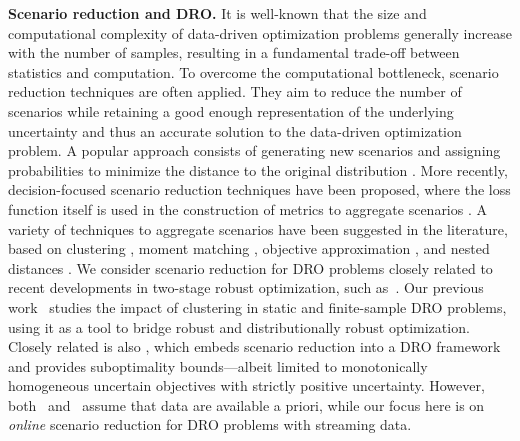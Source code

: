 \documentclass[12pt]{article}
\renewcommand{\paragraph}[1]{\textbf{#1.}\;}
\begin{document}
\paragraph{Scenario reduction and \gls{DRO}}
It is well-known that the size and computational complexity of data-driven optimization problems generally increase with the number of samples\ifpreprint, resulting in a fundamental trade-off between statistics and computation\fi. To overcome the computational bottleneck, scenario reduction techniques are often applied. They aim to reduce the number of scenarios while retaining a good enough representation of the underlying uncertainty and thus an accurate solution to the data-driven optimization problem. A popular approach consists of generating new scenarios and assigning probabilities to minimize the distance to the original distribution \cite{dupavcova2003scenario}. More recently, decision-focused scenario reduction techniques have been proposed, where the loss function itself is used in the construction of metrics to aggregate scenarios \cite{bertsimas2023optimization, zhang2023optimized}. A variety of techniques to aggregate scenarios have been suggested in the literature, based on clustering \cite{hewitt2022decision}, moment matching \cite{mehrotra2013generating}, objective approximation \cite{zenios1993constructing}, and nested distances \cite{horejvsova2020evaluation}.
We consider scenario reduction for DRO problems closely related to recent developments in two-stage robust optimization, such as~\cite{bertsimas2023optimization, zhang2023optimized}.
Our previous work~\cite{mro} studies the impact of clustering in static and finite-sample \gls{DRO} problems, using it as a tool to bridge robust and distributionally robust optimization.
Closely related is also \cite{aigner2025scenario}, which embeds scenario reduction into a \gls{DRO} framework and provides suboptimality bounds---albeit limited to monotonically homogeneous uncertain objectives with strictly positive uncertainty. However, both~\cite{mro} and~\cite{aigner2025scenario} assume that data are available a priori, while our focus here is on {\it online} scenario reduction for DRO problems with streaming data.


\end{document}
